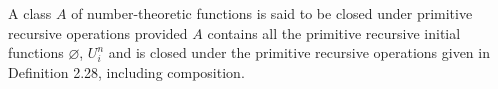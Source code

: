 A class $A$ of number-theoretic functions is said to be closed under primitive recursive operations provided $A$ contains all the primitive recursive initial functions $\varnothing$, $U_i^n$ and is closed under the primitive recursive operations given in Definition 2.28, including composition.
